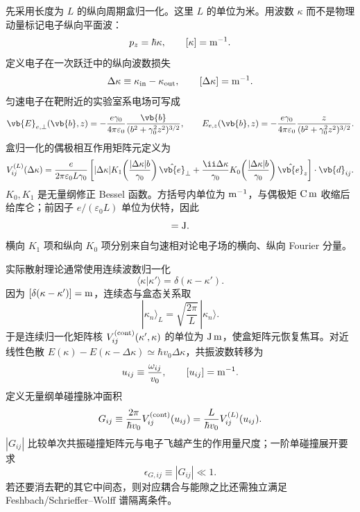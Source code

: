 先采用长度为 $L$ 的纵向周期盒归一化。这里 $L$ 的单位为米。用波数 $\kappa$ 而不是物理动量标记电子纵向平面波：
\begin{equation*}
p_z=\hbar \kappa,
\qquad [\kappa]={\rm m^{-1}}.
\end{equation*}
定义电子在一次跃迁中的纵向波数损失
\begin{equation*}
\Delta\kappa\equiv \kappa_{\rm in}-\kappa_{\rm out},
\qquad [\Delta\kappa]={\rm m^{-1}}.
\end{equation*}
匀速电子在靶附近的实验室系电场可写成
\begin{equation}
{
\vb{E}_{e,\perp}(\vb{b},z)
=-\frac{e\gamma_0}{4\pi\varepsilon_0}
\frac{\vb{b}}{(b^2+\gamma_0^2z^2)^{3/2}},
\qquad
E_{e,z}(\vb{b},z)
=-\frac{e\gamma_0}{4\pi\varepsilon_0}
\frac{z}{(b^2+\gamma_0^2z^2)^{3/2}}.}
\label{eq:uniform_electron_boosted_coulomb_field}
\end{equation}
盒归一化的偶极相互作用矩阵元定义为
\begin{equation}
{
 V_{ij}^{(L)}(\Delta\kappa)
=\frac{e}{2\pi\varepsilon_0L\gamma_0}
\left[
|\Delta\kappa|K_1\!\left(\frac{|\Delta\kappa|b}{\gamma_0}\right)
\hat{\vb{e}}_\perp
+\frac{\ii\Delta\kappa}{\gamma_0}
K_0\!\left(\frac{|\Delta\kappa|b}{\gamma_0}\right)
\hat{\vb{e}}_z
\right]\cdot\vb{d}_{ij}.}
\label{eq:feberi_bessel_coulomb_matrix_element}
\end{equation}
$K_0,K_1$ 是无量纲修正 Bessel 函数。方括号内单位为 ${\rm m^{-1}}$，与偶极矩 ${\rm C\,m}$ 收缩后给库仑；前因子 $e/(\varepsilon_0L)$ 单位为伏特，因此
\begin{equation*}
[V_{ij}^{(L)}]={\rm J}.
\end{equation*}
横向 $K_1$ 项和纵向 $K_0$ 项分别来自匀速相对论电子场的横向、纵向 Fourier 分量。

实际散射理论通常使用连续波数归一化
\begin{equation*}
\langle \kappa|\kappa'\rangle=\delta(\kappa-\kappa').
\end{equation*}
因为 $[\delta(\kappa-\kappa')]={\rm m}$，连续态与盒态关系取
\begin{equation*}
|\kappa_n\rangle_L
=\sqrt{\frac{2\pi}{L}}\,|\kappa_n\rangle.
\end{equation*}
于是连续归一化矩阵核 $V_{ij}^{({\rm cont})}(\kappa',\kappa)$ 的单位为 ${\rm J\,m}$，使盒矩阵元恢复焦耳。对近线性色散 $E(\kappa)-E(\kappa-\Delta\kappa)\simeq\hbar v_0\Delta\kappa$，共振波数转移为
\begin{equation*}
u_{ij}\equiv\frac{\omega_{ij}}{v_0},
\qquad [u_{ij}]={\rm m^{-1}}.
\end{equation*}
定义无量纲单碰撞脉冲面积
\begin{equation*}
G_{ij}
\equiv
\frac{2\pi}{\hbar v_0}
 V_{ij}^{({\rm cont})}(u_{ij})
=\frac{L}{\hbar v_0}
 V_{ij}^{(L)}(u_{ij}).
\end{equation*}
$|G_{ij}|$ 比较单次共振碰撞矩阵元与电子飞越产生的作用量尺度；一阶单碰撞展开要求
\begin{equation*}
\epsilon_{G,ij}\equiv|G_{ij}|\ll1.
\end{equation*}
若还要消去靶的其它中间态，则对应耦合与能隙之比还需独立满足 Feshbach/Schrieffer--Wolff 谱隔离条件。

